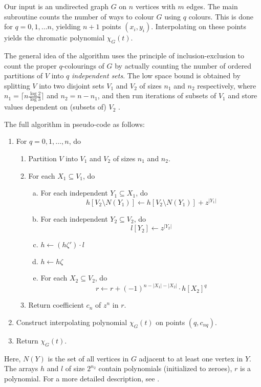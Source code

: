 \documentclass{cslthse-msc}
\begin{document}
Our input is an undirected graph $G$ on $n$ vertices with $m$ edges. The main subroutine counts the number of ways to colour $G$ using $q$ colours. This is done for $q = 0, 1, \ldots n$, yielding $n + 1$ points $(x_i, y_i)$. Interpolating on these points yields the chromatic polynomial $\chi_G(t)$.

The general idea of the algorithm uses the principle of inclusion-exclusion to count the proper $q$-colourings of $G$ by actually counting the number of ordered partitions of $V$ into $q$ \emph{independent sets}. The low space bound is obtained by splitting $V$ into two disjoint sets $V_1$ and $V_2$ of sizes $n_1$ and $n_2$ respectively, where $n_1 = \lceil n \frac{\log2}{\log3} \rceil$ and $n_2 = n - n_1$, and then run iterations of subsets of $V_1$ and store values dependent on (subsets of) $V_2$ \cite[sec. 5]{cov_pack}. 

The full algorithm in pseudo-code as follows:

\begin{enumerate}[{Step} A.]
\item \label{q} For $q = 0, 1, \ldots, n$, do
\begin{enumerate}[1.]
  \item Partition $V$ into $V_1$ and $V_2$ of sizes $n_1$ and $n_2$.
  \item \label{step1} For each $X_1 \subseteq V_1$, do
  \begin{enumerate}[a)]
  \item \label{indep1} For each independent $Y_1 \subseteq X_1$, do
\[ h[V_2 \setminus N(Y_1)] \leftarrow h[V_2 \setminus N(Y_1)] + z^{|Y_1|} \]
  \item \label{indep2} For each independent $Y_2 \subseteq V_2$, do
\[ l[Y_2] \leftarrow z^{|Y_2|} \]
  \item \label{multi} $h \leftarrow (h\zeta')\cdot l$
  \item $h \leftarrow h\zeta$
  \item \label{rstep}For each $X_2 \subseteq V_2$, do
\[ r \leftarrow r + (-1)^{n - |X_1| - |X_2|}\cdot h[X_2]^q \]
  \end{enumerate}
  \item Return coefficient $c_n$ of $z^n$ in $r$.
\end{enumerate}
\item Construct interpolating polynomial $\chi_G(t)$ on points $(q, c_{nq})$.
\item Return $\chi_G(t)$.
\end{enumerate}
Here, $N(Y)$ is the set of all vertices in $G$ adjacent to at least one vertex in $Y$. The arrays $h$ and $l$ of size $2^{n_2}$ contain polynomials (initialized to zeroes), $r$ is a polynomial. For a more detailed description, see \cite[p 9]{cov_pack}.
\end{document}
